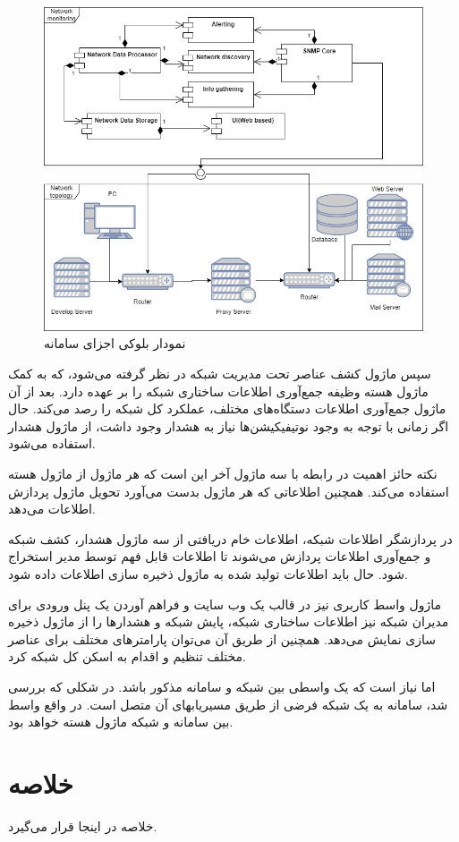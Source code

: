\begin{figure}[!h]
\centering\includegraphics[scale=.55]{./diagram}
\caption{نمودار بلوکی اجزای سامانه}\label{fig.11}
\end{figure}


سپس ماژول کشف عناصر تحت مدیریت شبکه در نظر گرفته می‌شود، که به کمک ماژول هسته وظیفه جمع‌آوری اطلاعات ساختاری شبکه را بر عهده دارد. بعد از آن ماژول جمع‌آوری اطلاعات دستگاه‌های مختلف، عملکرد کل شبکه را رصد می‌کند. حال اگر زمانی با توجه به وجود نوتیفیکیشن‌ها نیاز به هشدار وجود داشت، از ماژول هشدار استفاده می‌شود. 

\newpage

نکته حائز اهمیت در رابطه با سه ماژول آخر این است که هر ماژول از ماژول هسته استفاده می‌کند. همچنین اطلاعاتی که هر ماژول بدست می‌آورد تحویل ماژول پردازش اطلاعات می‌دهد.

در پردازشگر اطلاعات شبکه، اطلاعات خام دریافتی از سه ماژول هشدار، کشف شبکه و جمع‌آوری اطلاعات پردازش می‌شوند تا اطلاعات قابل فهم توسط مدیر استخراج شود. حال باید اطلاعات تولید شده به ماژول ذخیره سازی اطلاعات داده شود.

ماژول واسط کاربری نیز در قالب یک وب سایت و فراهم آوردن یک پنل ورودی برای مدیران شبکه نیز اطلاعات ساختاری شبکه، پایش شبکه و هشدارها را از ماژول ذخیره سازی نمایش می‌دهد. همچنین از طریق آن می‌توان پارامترهای مختلف برای عناصر مختلف تنظیم و اقدام به اسکن کل شبکه کرد.

اما نیاز است که یک واسطی بین شبکه و سامانه مذکور باشد. در شکلی که بررسی شد، سامانه به یک شبکه فرضی از طریق مسیریابهای آن متصل است. در واقع واسط بین سامانه و شبکه ماژول هسته  خواهد بود.






\section{خلاصه}


خلاصه در اینجا قرار می‌گیرد.



